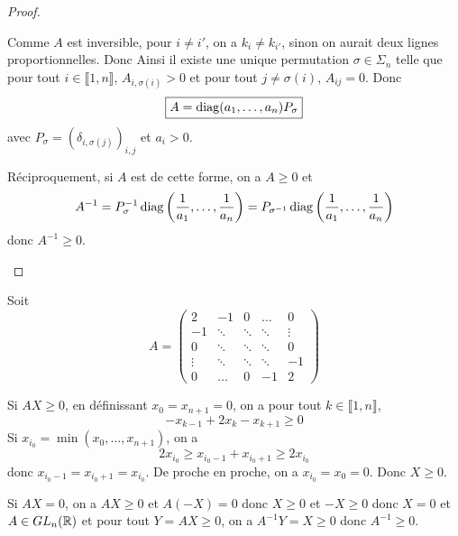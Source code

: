 \begin{proof}
\begin{enumerate}
        Comme $A$ est inversible, pour $i\neq i'$, on a $k_{i}\neq k_{i'}$, sinon on aurait deux lignes proportionnelles. Donc 
        Ainsi il existe une unique permutation $\sigma\in\Sigma_{n}$ telle que pour tout $i\in\llbracket1,n\rrbracket$, $A_{i,\sigma(i)}>0$ et pour tout $j\neq\sigma(i)$, $A_{ij}=0$. Donc 
        \begin{equation}
            \boxed{A=\operatorname{diag}(a_{1},\dots,a_{n})P_{\sigma}}
        \end{equation}
        avec $P_{\sigma}=(\delta_{i,\sigma(j)})_{i,j}$ et $a_{i}>0$.

        Réciproquement, si $A$ est de cette forme, on a $A\geqslant0$ et 
        \begin{equation}
            A^{-1}=P^{-1}_{\sigma}\operatorname{diag}\left(\frac{1}{a_{1}},\dots,\frac{1}{a_{n}}\right)=P_{\sigma^{-1}}\operatorname{diag}\left(\frac{1}{a_{1}},\dots,\frac{1}{a_{n}}\right)
        \end{equation}
        donc $A^{-1}\geqslant0$.
    \end{enumerate}
\end{proof}

\begin{remark}
    Soit 
    \begin{equation}
        A=
        \begin{pmatrix}
            2   & -1    & 0   &\dots &0\\
            -1  & \ddots&\ddots     &\ddots&\vdots\\
            0   & \ddots&\ddots     &\ddots&0\\
            \vdots&\ddots&\ddots&\ddots&-1\\
            0&\dots&0&-1&2
        \end{pmatrix}
    \end{equation}

    Si $AX\geqslant0$, en définissant $x_{0}=x_{n+1}=0$, on a pour tout $k\in\llbracket1,n\rrbracket$,
    \begin{equation}
        -x_{k-1}+2x_{k}-x_{k+1}\geqslant0
    \end{equation}
    Si $x_{i_{0}}=\min(x_{0},\dots,x_{n+1})$, on a 
    \begin{equation}
        2x_{i_{0}}\geqslant x_{i_{0}-1}+x_{i_{0}+1}\geqslant 2x_{i_{0}}
    \end{equation}
    donc $x_{i_{0}-1}=x_{i_{0}+1}=x_{i_{0}}$. De proche en proche, on a $x_{i_{0}}=x_{0}=0$. Donc $X\geqslant0$.

    Si $AX=0$, on a $AX\geqslant0$ et $A(-X)=0$ donc $X\geqslant0$ et $-X\geqslant0$ donc $X=0$ et $A\in GL_{n}(\mathbb{R})$ et pour tout $Y=AX\geqslant0$, on a $A^{-1}Y=X\geqslant0$ donc $A^{-1}\geqslant0$.
\end{remark}

